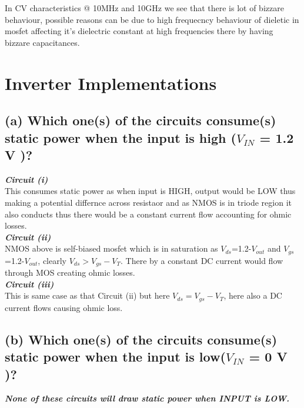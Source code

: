\documentclass{article}
\begin{document}
 \newline
In CV characteristics @ 10MHz and 10GHz we see that there is lot of bizzare behaviour, possible reasons can be due to high frequecncy behaviour of dieletic in mosfet affecting it's dielectric constant at high frequencies there by having bizzare capacitances.
\section{\textbf{Inverter Implementations}}
\subsection*{(a) Which one(s) of the circuits consume(s) static power when the input is high
($V_{IN}$ = 1.2 V )?}
\textbf{\textit{Circuit (i)}}\\
This consumes static power as when input is HIGH, output would be LOW thus making a potential differnce across resistaor and as NMOS is in triode region it also conducts thus there would be a constant current flow accounting for ohmic losses.\\
 \newline
\textbf{\textit{Circuit (ii)}}\\
NMOS above is self-biased mosfet which is in saturation as $V_{ds}$=1.2-$V_{out}$ and $V_{gs}$=1.2-$V_{out}$, clearly $V_{ds} > V_{gs} - V_T$. There by a constant DC current would flow through MOS creating ohmic losses.\\
 \newline
\textbf{\textit{Circuit (iii)}}\\
This is same case as that Circuit (ii) but here $V_{ds} = V_{gs} - V_T$, here also a DC current flows causing ohmic loss.

\subsection*{(b) Which one(s) of the circuits consume(s) static power when the input is low($V_{IN}$ =
0 V )?}
\textit{\textbf{None of these circuits will draw static power when INPUT is LOW.}}
\end{document}
